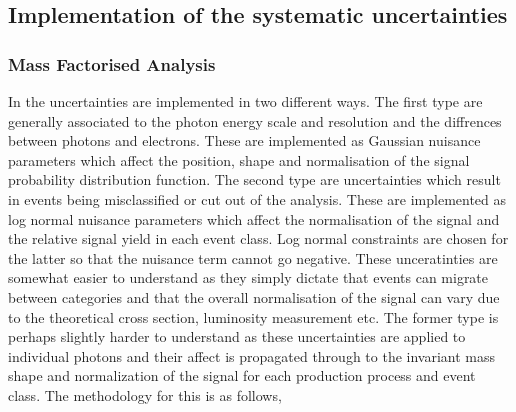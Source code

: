 \subsection{Implementation of the systematic uncertainties}

\subsubsection{Mass Factorised Analysis}

In the \MFM uncertainties are implemented in two different ways. The first type are generally associated to the photon energy scale and resolution and the diffrences between photons and electrons. These are implemented as Gaussian nuisance parameters which affect the position, shape and normalisation of the signal probability distribution function. The second type are uncertainties which result in events being misclassified or cut out of the analysis. These are implemented as log normal nuisance parameters which affect the normalisation of the signal and the relative signal yield in each event class. Log normal constraints are chosen for the latter so that the nuisance term cannot go negative. These unceratinties are somewhat easier to understand as they simply dictate that events can migrate between categories and that the overall normalisation of the signal can vary due to the theoretical cross section, luminosity measurement etc. The former type is perhaps slightly harder to understand as these uncertainties are applied to individual photons and their affect is propagated through to the invariant mass shape and normalization of the signal for each production process and event class. The methodology for this is as follows,

